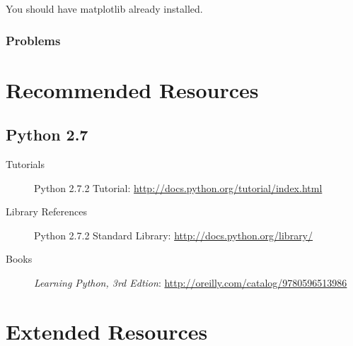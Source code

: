 \documentclass{report}
\begin{document}
You should have matplotlib already installed.

\subsection{Problems}



\chapter{Recommended Resources}
\section{Python 2.7}
\begin{description}
	\item[Tutorials]
Python 2.7.2 Tutorial: \url{http://docs.python.org/tutorial/index.html} \cite{website:Python272docs}
	\item[Library References]
Python 2.7.2 Standard Library:  \url{http://docs.python.org/library/} \cite{website:Python272docs}
	\item[Books]
\emph{Learning Python, 3rd Edtion}: \url{http://oreilly.com/catalog/9780596513986}  \cite{LearningPython3rd}
\end{description}

\chapter{Extended Resources}
\end{document}
